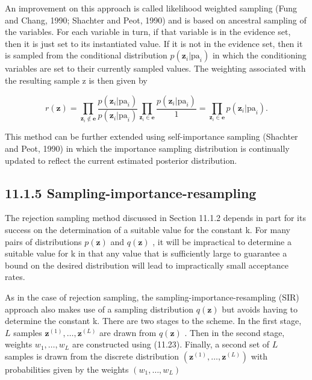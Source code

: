 \documentclass[
  10
]{article}
\begin{document}
An improvement on this approach is called likelihood weighted sampling
(Fung and Chang, 1990; Shachter and Peot, 1990) and is based on
ancestral sampling of the variables. For each variable in turn, if that
variable is in the evidence set, then it is just set to its instantiated
value. If it is not in the evidence set, then it is sampled from the
conditional distribution
\(p ( \mathbf { z } _ { i } | \mathrm { p a } _ { i } )\) in which the
conditioning variables are set to their currently sampled values. The
weighting associated with the resulting sample z is then given by

\[
r (\mathbf {z}) = \prod_ {\mathbf {z} _ {i} \not \in \mathbf {e}} \frac {p (\mathbf {z} _ {i} | \mathrm{pa} _ {i})}{p (\mathbf {z} _ {i} | \mathrm{pa} _ {i})} \prod_ {\mathbf {z} _ {i} \in \mathbf {e}} \frac {p (\mathbf {z} _ {i} | \mathrm{pa} _ {i})}{1} = \prod_ {\mathbf {z} _ {i} \in \mathbf {e}} p (\mathbf {z} _ {i} | \mathrm{pa} _ {i}).\tag{11.24}
\]

This method can be further extended using self-importance sampling
(Shachter and Peot, 1990) in which the importance sampling distribution
is continually updated to reflect the current estimated posterior
distribution.

\subsection{11.1.5
Sampling-importance-resampling}\label{sampling-importance-resampling}

The rejection sampling method discussed in Section 11.1.2 depends in
part for its success on the determination of a suitable value for the
constant k. For many pairs of distributions \(p ( \mathbf { z } )\) and
\(q ( \mathbf { z } )\) , it will be impractical to determine a suitable
value for k in that any value that is sufficiently large to guarantee a
bound on the desired distribution will lead to impractically small
acceptance rates.

As in the case of rejection sampling, the sampling-importance-resampling
(SIR) approach also makes use of a sampling distribution
\(q ( \mathbf { z } )\) but avoids having to determine the constant k.
There are two stages to the scheme. In the first stage, \(L\) samples
\(\mathbf { z } ^ { ( 1 ) } , \ldots , \mathbf { z } ^ { ( L ) }\) are
drawn from \(q ( \mathbf { z } )\) . Then in the second stage, weights
\(w _ { 1 } , \ldots , w _ { L }\) are constructed using (11.23).
Finally, a second set of \(L\) samples is drawn from the discrete
distribution
\(( \mathbf { z } ^ { ( 1 ) } , \ldots , \mathbf { z } ^ { ( L ) } )\)
with probabilities given by the weights
\(( w _ { 1 } , \dots , w _ { L } )\)
\end{document}
